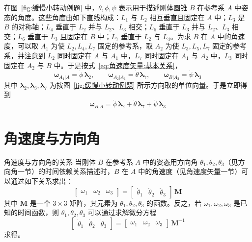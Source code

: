 \blocksep
\begin{example}
    在图~\ref{fig:缓慢小转动例题} 中，$\theta,\phi,\psi$ 表示用于描述刚体圆锥 $B$ 在参考系 $A$ 中姿态的角度。这些角度由如下直线构成：$L_1$ 与 $L_2$ 相互垂直且固定在 $A$ 中；$L_3$ 是 $B$ 的对称轴；$L_4$ 垂直于 $L_2$ 并与 $L_2$、$L_3$ 相交；$L_5$ 垂直于 $L_3$ 并与 $L_2$、$L_3$ 相交；$L_6$ 垂直于 $L_3$ 且固定在 $B$ 中；$L_7$ 垂直于 $L_2$ 与 $L_4$。为求 $B$ 在 $A$ 中的角速度，可以取 $A_1$ 为使 $L_2,L_4,L_7$ 固定的参考系，取 $A_2$ 为使 $L_3,L_5,L_7$ 固定的参考系，并注意到 $L_2$ 同时固定在 $A$ 与 $A_1$ 中，$L_7$ 同时固定在 $A_1$ 与 $A_2$ 中，$L_3$ 同时固定在 $A_2$ 与 $B$ 中。于是按式~\eqref{eq:角速度矢量:基本关系}，
    \begin{equation}
        \bm{\omega}_{A_1|A} = \dot{\phi}\,\bm{\lambda}_2,\qquad
        \bm{\omega}_{A_2|A_1} = \dot{\theta}\,\bm{\lambda}_7,\qquad
        \bm{\omega}_{B|A_2} = \dot{\psi}\,\bm{\lambda}_3
        \label{eq:辅助参考系:各角速度}
    \end{equation}
    其中 $\bm{\lambda}_2,\bm{\lambda}_3,\bm{\lambda}_7$ 为按图~\ref{fig:缓慢小转动例题} 所示方向取的单位向量。于是立即得到
    \begin{equation}
        \bm{\omega}_{B|A} = \dot{\phi}\,\bm{\lambda}_2 + \dot{\theta}\,\bm{\lambda}_7 + \dot{\psi}\,\bm{\lambda}_3
        \label{eq:辅助参考系:角速度合成}
    \end{equation}
\end{example}

\section{角速度与方向角}
\begin{myTheorem}{角速度与方向角的关系}
当刚体 $B$ 在参考系 $A$ 中的姿态用方向角 $\theta_1,\theta_2,\theta_3$（见方向角一节）的时间依赖关系描述时，$B$ 在 $A$ 中的角速度（见角速度矢量一节）可以通过如下关系求出：
\begin{equation}
    \begin{bmatrix}\omega_1 & \omega_2 & \omega_3\end{bmatrix}
    = \begin{bmatrix}\dot{\theta}_1 & \dot{\theta}_2 & \dot{\theta}_3\end{bmatrix}\,\bm{M}
    \label{eq:方向角角速度:基本关系}
\end{equation}
其中 $\bm{M}$ 是一个 $3\times3$ 矩阵，其元素为 $\theta_1,\theta_2,\theta_3$ 的函数。反之，若 $\omega_1,\omega_2,\omega_3$ 是已知的时间函数，则 $\theta_1,\theta_2,\theta_3$ 可以通过求解微分方程
\begin{equation}
    \begin{bmatrix}\dot{\theta}_1 & \dot{\theta}_2 & \dot{\theta}_3\end{bmatrix}
    = \begin{bmatrix}\omega_1 & \omega_2 & \omega_3\end{bmatrix}\,\bm{M}^{-1}
    \label{eq:方向角角速度:逆关系}
\end{equation}
求得。
\end{myTheorem}

